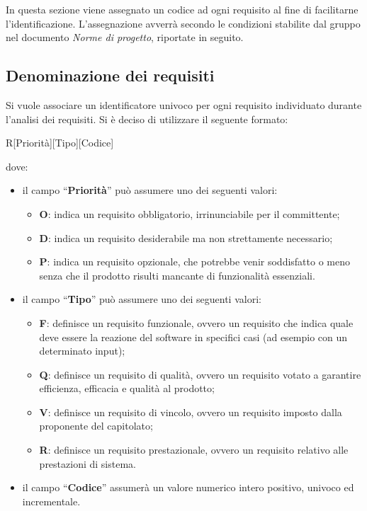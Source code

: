 In questa sezione viene assegnato un codice ad ogni requisito al fine di facilitarne l'identificazione. L'assegnazione avverrà secondo le condizioni stabilite dal gruppo nel documento \textit{Norme di progetto}, riportate in seguito. 
\subsection{Denominazione dei requisiti}
Si vuole associare un identificatore univoco per ogni requisito individuato durante l'analisi dei requisiti. Si \`e deciso di utilizzare il seguente formato:
  \begin{center}
    R[Priorità][Tipo][Codice]
	\end{center}
dove:
	\begin{itemize}
	\item il campo “\textbf{Priorità}” può assumere uno dei seguenti 	valori:
		\begin{itemize}
  		\item \textbf{O}: indica un requisito obbligatorio, irrinunciabile per il committente;
		\item \textbf{D}: indica un requisito desiderabile ma non strettamente necessario;
		\item \textbf{P}: indica un requisito opzionale, che potrebbe venir soddisfatto o meno senza che il prodotto risulti mancante di funzionalità essenziali.
		\end{itemize}
	\item il campo “\textbf{Tipo}” può assumere uno dei seguenti valori:
		\begin{itemize}
  		\item \textbf{F}: definisce un requisito funzionale, ovvero un requisito che indica quale deve essere la reazione del software in specifici casi (ad esempio con  un determinato input);
		\item \textbf{Q}: definisce un requisito di qualità, ovvero un requisito votato a garantire efficienza, efficacia e qualità al prodotto;
		\item \textbf{V}: definisce un requisito di vincolo, ovvero un requisito imposto dalla proponente del capitolato;
		\item \textbf{R}: definisce un requisito prestazionale, ovvero un requisito relativo alle prestazioni di sistema.
		\end{itemize}
	\item il campo “\textbf{Codice}” assumerà un valore numerico intero positivo, univoco ed incrementale.
	\end{itemize}
	
